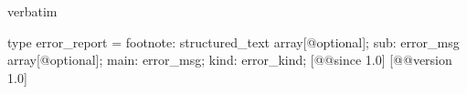 \begin{camlexample}{verbatim}
\begin{caml}
\begin{camlinput}
type error_report = {
  footnote: structured_text array[@optional];
  sub: error_msg array[@optional];
  main: error_msg;
  kind: error_kind;
} [@@since 1.0]
[@@version 1.0]
\end{camlinput}
\end{caml}
\end{camlexample}
